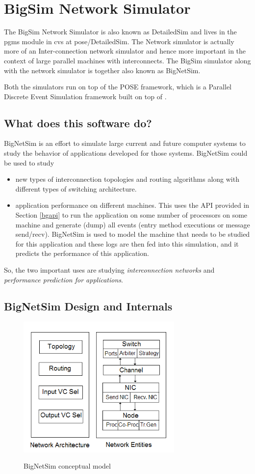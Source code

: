 \section{BigSim Network Simulator}
\label{bignetsim}

The BigSim Network Simulator is also known as DetailedSim and lives 
in the pgms module in cvs at pose/DetailedSim. 
The Network simulator is actually more of an Inter-connection network 
simulator and hence more important in the context of large parallel
machines with interconnects. 
The BigSim simulator  along with the network simulator is together 
also known as BigNetSim.

Both the simulators run on top of the POSE framework, which is a Parallel
Discrete Event Simulation framework built on top of \charmpp{}.


\subsection{What does this software do?}
BigNetSim is an effort to simulate large current and future computer 
systems to study the behavior of applications developed for those systems. 
BigNetSim could be used to study
\begin{itemize}
\item  new types of interconnection topologies and routing algorithms 
along with different types of switching architecture.
\item application performance on different machines. This uses the API
provided in Section \ref{bgapi} to run the application on some number
of processors on some machine and generate (dump) all events (entry
method executions or message send/recv).  BigNetSim is used to 
model the machine that needs to be studied for this application and
these logs are then fed into this simulation, and it predicts the
performance of this application.
\end{itemize}

So, the two important uses are studying {\it interconnection networks} and
{\it performance prediction for applications}.


\subsection{BigNetSim Design and Internals}
\begin{figure}[!t]
\centering  
  \includegraphics[width=3.2in]{figures/detailedsim_newer}
{\sffamily\bfseries\small \caption{BigNetSim conceptual model\label{fig:detailedsim_model}}}
\end{figure}

